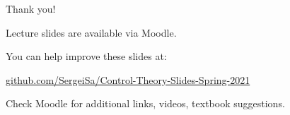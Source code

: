 \documentclass{beamer}
\begin{document}
\begin{frame}{Thank you!}
\centerline{Lecture slides are available via Moodle.}
\bigskip
\centerline{You can help improve these slides at:}
\centerline{\href{https://github.com/SergeiSa/Control-Theory-Slides-Spring-2021}{github.com/SergeiSa/Control-Theory-Slides-Spring-2021}}
\bigskip
\centerline{Check Moodle for additional links, videos, textbook suggestions.}
\end{frame}
\end{document}

